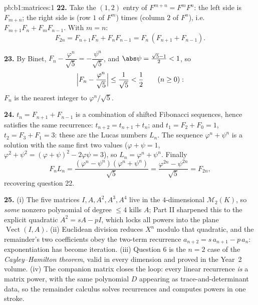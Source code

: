 \begin{solution}{pb:b1:matrices:1}
\textbf{22.} Take the $(1,2)$ entry of $F^{m+n} = F^m F^n$: the
left side is $F_{m+n}$; the right side is (row $1$ of $F^m$)
times (column $2$ of $F^n$), i.e.\ $F_{m+1}F_n + F_m F_{n-1}$.
With $m = n$:
\[
F_{2n} = F_{n+1}F_n + F_nF_{n-1} = F_n\,(F_{n+1} + F_{n-1}).
\]

\textbf{23.} By Binet, $F_n - \dfrac{\varphi^n}{\sqrt5} =
-\dfrac{\psi^n}{\sqrt5}$, and $\abs\psi = \frac{\sqrt5 - 1}2 <
1$, so
\[
\Bigl|F_n - \frac{\varphi^n}{\sqrt5}\Bigr|
\leq \frac{1}{\sqrt5} < \frac12
\qquad (n \geq 0):
\]
$F_n$ is the nearest integer to $\varphi^n/\sqrt5$.

\textbf{24.} $t_n = F_{n+1} + F_{n-1}$ is a combination of
shifted Fibonacci sequences, hence satisfies the same
recurrence: $t_{n+2} = t_{n+1} + t_n$; and $t_1 = F_2 + F_0 =
1$, $t_2 = F_3 + F_1 = 3$: these are the Lucas numbers $L_n$.
The sequence $\varphi^n + \psi^n$ is a solution with the same
first two values ($\varphi + \psi = 1$, $\varphi^2 + \psi^2 = (
\varphi + \psi)^2 - 2\varphi\psi = 3$), so $L_n = \varphi^n +
\psi^n$. Finally
\[
F_n L_n = \frac{(\varphi^n - \psi^n)(\varphi^n +
\psi^n)}{\sqrt5} = \frac{\varphi^{2n} - \psi^{2n}}{\sqrt5} =
F_{2n},
\]
recovering question 22.

\textbf{25.} (i) The five matrices $I, A, A^2, A^3, A^4$ live in
the $4$-dimensional $\mathcal{M}_2(K)$, so \emph{some} nonzero
polynomial of degree $\leq 4$ kills $A$; Part II sharpened this
to the explicit quadratic $A^2 = sA - pI$, which locks all
powers into the plane $\operatorname{Vect}(I, A)$. (ii)
Euclidean division reduces $X^n$ modulo that quadratic, and the
remainder's two coefficients obey the two-term recurrence
$a_{n+2} = s\,a_{n+1} - p\,a_n$: exponentiation has become
iteration. (iii) Question 6 is the $n = 2$ case of the
\emph{Cayley--Hamilton theorem}, valid in every dimension and
proved in the Year~2 volume. (iv) The companion matrix closes
the loop: every linear recurrence \emph{is} a matrix power, with
the same polynomial $D$ appearing as trace-and-determinant data,
so the remainder calculus solves recurrences and computes powers
in one stroke.
\end{solution}
